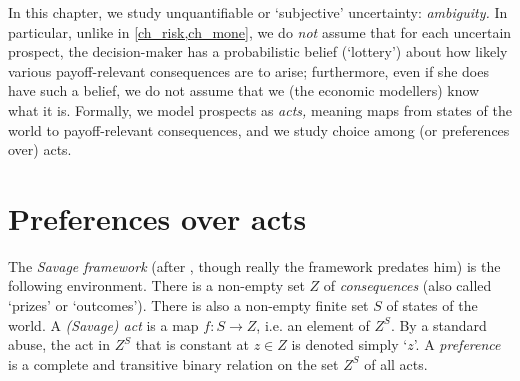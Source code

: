 




In this chapter, we study unquantifiable or `subjective' uncertainty: \emph{ambiguity.} In particular, unlike in \cref{ch_risk,ch_mone}, we do \emph{not} assume that for each uncertain prospect, the decision-maker has a probabilistic belief (`lottery') about how likely various payoff-relevant consequences are to arise; furthermore, even if she does have such a belief, we do not assume that we (the economic modellers) know what it is. Formally, we model prospects as \emph{acts,} meaning maps from states of the world to payoff-relevant consequences, and we study choice among (or preferences over) acts.



\section{Preferences over acts}
\label{sec:acts}

The \emph{Savage framework} (after \cite{Savage1954}, though really the framework predates him) is the following environment. There is a non-empty set $Z$ of \emph{consequences} (also called `prizes' or `outcomes'). There is also a non-empty finite set $S$ of states of the world. A \emph{(Savage) act} is a map $f : S \to Z$, i.e. an element of $Z^S$. By a standard abuse, the act in $Z^S$ that is constant at $z \in Z$ is denoted simply `$z$'. A \emph{preference} is a complete and transitive binary relation on the set $Z^S$ of all acts.

